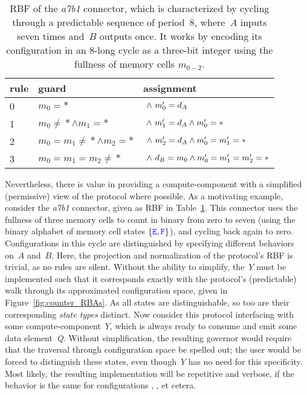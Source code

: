 \begin{table}
	\centering
	\begin{tabular}{l|ll}
		rule & guard & assignment \\
		\hline
		0 & $m_0=*$
		& $\ \wedge{}\ {}m_0'=d_A$\\
		1 & $m_0\neq{}*\wedge{}m_1=*$
		& $\ \wedge{}\ {}m_1'=d_A\wedge{}m_0'=*$\\
		2 & $m_0=m_1\neq{}*\wedge{}m_2=*$
		& $\ \wedge{}\ {}m_2'=d_A\wedge{}m_0'=m_1'=*$\\
		3 & $m_0=m_1=m_2\neq{}*$
		& $\ \wedge{}\ {}d_B=m_0\wedge{}m_0'=m_1'=m_2'=*$\\
		\hline
	\end{tabular}
	\caption{RBF of the \textit{a7b1} connector, which is characterized by cycling through a predictable sequence of period~8, where~$A$ inputs seven times and~$B$ outputs once. It works by encoding its configuration in an 8-long cycle as a three-bit integer using the fullness of memory cells $m_{0-2}$.}
	\label{tab:counting_rbf}
\end{table}

Nevertheless, there is value in providing a compute-component with a simplified (permissive) view of the protocol where possible. As a motivating example, consider the \textit{a7b1} connector, given as RBF in Table~\ref{tab:counting_rbf}. This connector uses the fullness of three memory cells to count in binary from zero to seven (using the binary alphabet of memory cell states $\{\text{\textcolor{blue}{\texttt{E}}}, \text{\textcolor{blue}{\texttt{F}}}\}$), and cycling back again to zero. Configurations in this cycle are distinguished by specifying different behaviors on~$A$ and~$B$. Here, the projection and normalization of the protocol's RBF is trivial, as no rules are silent. Without the ability to simplify, the~$Y$ must be implemented such that it corresponds exactly with the protocol's (predictable) walk through its approximated configuration space, given in Figure~\ref{fig:counter_RBAs}. As all states are distinguishable, so too are their corresponding \textit{state types} distinct. Now consider this protocol interfacing with some compute-component~$Y$, which is always ready to consume and emit some data element~\textit{Q}. Without simplification, the resulting governor would require that the traversal through configuration space be spelled out; the user would be forced to distinguish these states, even though~$Y$ has no need for this specificity. Most likely, the resulting implementation will be repetitive and verbose, if the behavior is the same for configurations , , et cetera.

